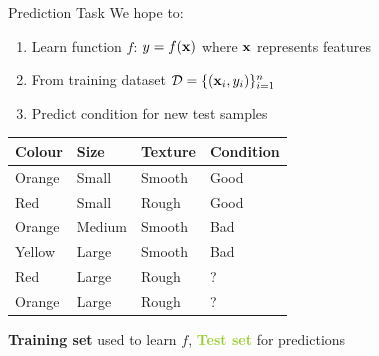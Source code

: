 \documentclass[usenames,dvipsnames]{beamer}
\begin{document}
\begin{frame}{Prediction Task}
We hope to:
\begin{enumerate}
	\item \pause Learn function $f$: $y = f(\mathbf{x})$ where $\mathbf{x}$ represents features
	\item \pause From training dataset $\mathcal{D} = \{(\mathbf{x}_i, y_i)\}_{i=1}^n$
	\item \pause Predict condition for new test samples
\end{enumerate}

\pause
\begin{table}[]
	\begin{tabular}{|l|l|l||l|}
		\hline 
		\rowcolor{white}
		\cellcolor{Lavender}\textbf{Colour} & \cellcolor{Lavender}\textbf{Size} & \cellcolor{Lavender}\textbf{Texture} & \cellcolor{Tan}\textbf{Condition} \\ \hline 
		\rowcolor{Peach}
		\cellcolor{Lavender}Orange & \cellcolor{Lavender}Small & \cellcolor{Lavender}Smooth  & \cellcolor{Tan}Good      \\
		\rowcolor{Peach}
		\cellcolor{Lavender}Red    & \cellcolor{Lavender}Small  & \cellcolor{Lavender}Rough  & \cellcolor{Tan}Good \\
		\rowcolor{Peach}
		\cellcolor{Lavender}Orange & \cellcolor{Lavender}Medium & \cellcolor{Lavender}Smooth & \cellcolor{Tan}Bad \\
		\rowcolor{Peach}
		\cellcolor{Lavender}Yellow & \cellcolor{Lavender}Large  & \cellcolor{Lavender}Smooth & \cellcolor{Tan}Bad \\ \hline
		\rowcolor{YellowGreen}
		\cellcolor{Lavender}Red    & \cellcolor{Lavender}Large  & \cellcolor{Lavender}Rough  & \cellcolor{Tan}? \\
		\rowcolor{YellowGreen}
		\cellcolor{Lavender}Orange & \cellcolor{Lavender}Large & \cellcolor{Lavender}Rough  & \cellcolor{Tan}? \\ \hline          
	\end{tabular}
\end{table}

\textcolor{Peach}{\textbf{Training set}} used to learn $f$, \textcolor{YellowGreen}{\textbf{Test set}} for predictions
\end{frame}
\end{document}
